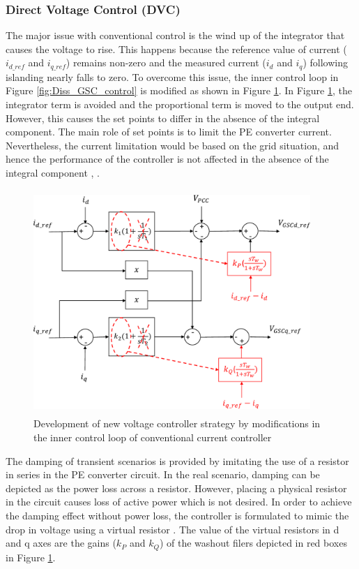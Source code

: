 \subsubsection{Direct Voltage Control (DVC)}\label{DVC_theory}
The major issue with conventional control is the wind up of the integrator that causes the voltage to rise. This happens because the reference value of current ($i_{d\_ref}$ and $i_{q\_ref}$) remains non-zero and the measured current ($i_d$ and $i_q$) following islanding nearly falls to zero. To overcome this issue, the inner control loop in Figure \ref{fig:Diss_GSC_control} is modified as shown in Figure \ref{fig:Diss_DVC_control}. In Figure \ref{fig:Diss_DVC_control}, the integrator term is avoided and the proportional term is moved to the output end. However, this causes the set points to differ in the absence of the integral component. The main role of set points is to limit the \gls{PE} converter current. Nevertheless, the current limitation would be based on the grid situation, and hence the performance of the controller is not affected in the absence of the integral component \cite{korai_dynamic_2019}, \cite{erlich_new_2017}.       

\begin{figure}[H]
\centering
    \includegraphics[height = 8.5cm,width = 10.5cm]{Diagrams/Chapter_2/Inner_control_GSC_chap2_2.pdf}
    \caption{ Development of new voltage controller strategy by modifications in the inner control loop of conventional current controller \cite{erlich_new_2017}}
    \label{fig:Diss_DVC_control}
\end{figure}

The damping of transient scenarios is provided by imitating the use of a resistor in series in the \gls{PE} converter circuit. In the real scenario, damping can be depicted as the power loss across a resistor. However, placing a physical resistor in the circuit causes loss of active power which is not desired. In order to achieve the damping effect without power loss, the controller is formulated to mimic the drop in voltage using a virtual resistor \cite{erlich_new_2017}. The value of the virtual resistors in d and q axes are the gains ($k_P$ and $k_Q$) of the washout filers depicted in red boxes in Figure \ref{fig:Diss_DVC_control}.

